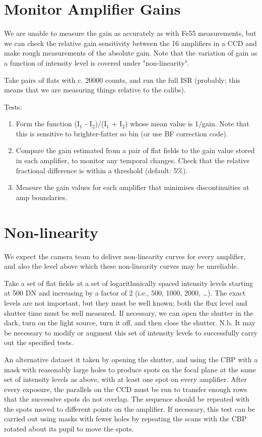 \documentclass[DM,authoryear,toc,lsstdraft]{lsstdoc}
\begin{document}
\section{Monitor Amplifier Gains}

We are unable to measure the gain as accurately as with Fe55 measurements, but we can check the relative
gain sensitivity between the 16 amplifiers in a CCD and make rough measurements of the absolute gain. Note
that the variation of gain as a function of intensity level is covered under "non-linearity".

Take pairs of flats with c. 20000 counts, and run the full ISR (probably; this means that we are measuring
things relative to the calibs).

Tests:
\begin{enumerate}
\item Form the function (I$_{\text{1}}$ - I$_{\text{2}}$)/(I$_{\text{1}}$ + I$_{\text{2}}$) whose mean value is 1/gain.  Note
that this is sensitive to brighter-fatter so bin (or use BF correction code).
\item Compare the gain estimated from a pair of flat fields to the gain value stored in each amplifier, to monitor any temporal changes. Check that the relative fractional difference is within a threshold (default: 5\%).
\item Measure the gain values for each amplifier that minimises discontinuities at amp boundaries.
\end{enumerate}

\section{Non-linearity}

We expect the camera team to deliver non-linearity curves for every amplifier, and also the level above which
these non-linearity curves may be unreliable.

Take a set of flat fields at a set of logarithmically spaced intensity levels starting at 500 DN and
increasing by a factor of 2 (i.e., 500, 1000, 2000, \ldots{}).  The exact levels are not important, but they must be
well known; both the flux level and shutter time must be well measured.  If necessary, we can open the shutter
in the dark, turn on the light source, turn it off, and then close the shutter.  N.b. It may be necessary to
modify or augment this set of intensity levels to successfully carry out the specified tests.

An alternative dataset it taken by opening the shutter, and using the CBP with a mask with reasonably large
holes to produce spots on the focal plane at the same set of intensity levels as above, with at least one
spot on every amplifier.  After every exposure, the parallels on the CCD must be run to transfer enough rows
that the successive spots do not overlap.  The sequence should be repeated with the spots moved to different points on the
amplifier.  If necessary, this test can be carried out using masks with fewer holes by repeating the scans
with the CBP rotated about its pupil to move the spots.
\end{document}
